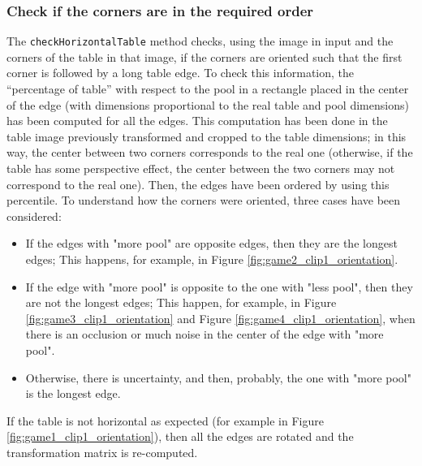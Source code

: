 \subsubsection{Check if the corners are in the required order}	%
The \texttt{checkHorizontalTable} method checks, using the image in input and the corners of the table in that image, if the corners are oriented such that the first corner is followed by a long table edge.
To check this information, the “percentage of table” with respect to the pool in a rectangle placed in the center of the edge (with dimensions proportional to the real table and pool dimensions) has been computed for all the edges. This computation has been done in the table image previously transformed and cropped to the table dimensions; in this way, the center between two corners corresponds to the real one (otherwise, if the table has some perspective effect, the center between the two corners may not correspond to the real one). Then, the edges have been ordered by using this percentile. To understand how the corners were oriented, three cases have been considered:
\begin{itemize}
	\item If the edges with "more pool" are opposite edges, then they are the longest edges; This happens, for example, in Figure \ref{fig:game2_clip1_orientation}.
	\item If the edge with "more pool" is opposite to the one with "less pool", then they are not the longest edges; This happen, for example, in Figure \ref{fig:game3_clip1_orientation} and Figure \ref{fig:game4_clip1_orientation}, when there is an occlusion or much noise in the center of the edge with "more pool".
	\item Otherwise, there is uncertainty, and then, probably, the one with "more pool" is the longest edge.
\end{itemize}
If the table is not horizontal as expected (for example in Figure \ref{fig:game1_clip1_orientation}), then all the edges are rotated and the transformation matrix is re-computed.

